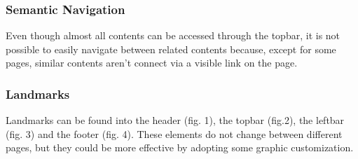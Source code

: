 \subsubsection{Semantic Navigation}
Even though almost all contents can be accessed through the topbar, it is not possible to easily navigate between related contents because, except for some pages, similar contents aren't connect via a visible link on the page. 

\subsubsection{Landmarks}
Landmarks can be found into the header (fig. 1), the topbar (fig.2), the leftbar (fig. 3) and the footer (fig. 4). These elements do not change between different pages, but they could be more effective by adopting some graphic customization.